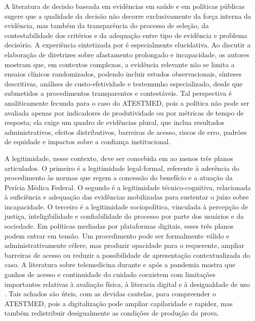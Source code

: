 \documentclass[12pt,a4paper]{article}
\begin{document}
A literatura de decisão baseada em evidências em saúde e em políticas públicas sugere que a qualidade da decisão não decorre exclusivamente da força interna da evidência, mas também da transparência do processo de seleção, da contestabilidade dos critérios e da adequação entre tipo de evidência e problema decisório. A experiência sintetizada por \textcite{gabbay2011niceguidanceonlongtermsicknessandincapacity} é especialmente elucidativa. Ao discutir a elaboração de diretrizes sobre afastamento prolongado e incapacidade, os autores mostram que, em contextos complexos, a evidência relevante não se limita a ensaios clínicos randomizados, podendo incluir estudos observacionais, sínteses descritivas, análises de custo-efetividade e testemunho especializado, desde que submetidos a procedimentos transparentes e contestáveis. Tal perspectiva é analiticamente fecunda para o caso do ATESTMED, pois a política não pode ser avaliada apenas por indicadores de produtividade ou por métricas de tempo de resposta; ela exige um quadro de evidências plural, que inclua resultados administrativos, efeitos distributivos, barreiras de acesso, riscos de erro, padrões de equidade e impactos sobre a confiança institucional.

A legitimidade, nesse contexto, deve ser concebida em ao menos três planos articulados. O primeiro é a legitimidade legal-formal, referente à aderência do procedimento às normas que regem a concessão do benefício e a atuação da Perícia Médica Federal. O segundo é a legitimidade técnico-cognitiva, relacionada à suficiência e adequação das evidências mobilizadas para sustentar o juízo sobre incapacidade. O terceiro é a legitimidade sociopolítica, vinculada à percepção de justiça, inteligibilidade e confiabilidade do processo por parte dos usuários e da sociedade. Em políticas mediadas por plataformas digitais, esses três planos podem entrar em tensão. Um procedimento pode ser formalmente válido e administrativamente célere, mas produzir opacidade para o requerente, ampliar barreiras de acesso ou reduzir a possibilidade de apresentação contextualizada do caso. A literatura sobre telemedicina durante e após a pandemia mostra que ganhos de acesso e continuidade do cuidado coexistem com limitações importantes relativas à avaliação física, à literacia digital e à desigualdade de uso \parencite{ftouni2022challengesoftelemedicineduringthecovid19pandemica,albasheer2026telemedicineutilizationanddigitalinclusionamongpe}. Tais achados são úteis, com as devidas cautelas, para compreender o ATESTMED, pois a digitalização pode ampliar capilaridade e rapidez, mas também redistribuir desigualmente as condições de produção da prova.
\end{document}
